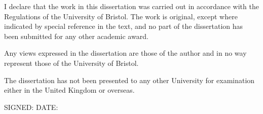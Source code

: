 \begin{declaration}
I declare that the work in this dissertation was carried out in accordance with the Regulations of the University of Bristol. The work is original, except where indicated by special reference in the text, and no part of the dissertation has been submitted for any other academic award.

Any views expressed in the dissertation are those of the author and in no way represent those of the University of Bristol.

The dissertation has not been presented to any other University for examination either in the United Kingdom or overseas.

\vspace{13mm}
SIGNED: \hspace{70mm} DATE:
\end{declaration}
